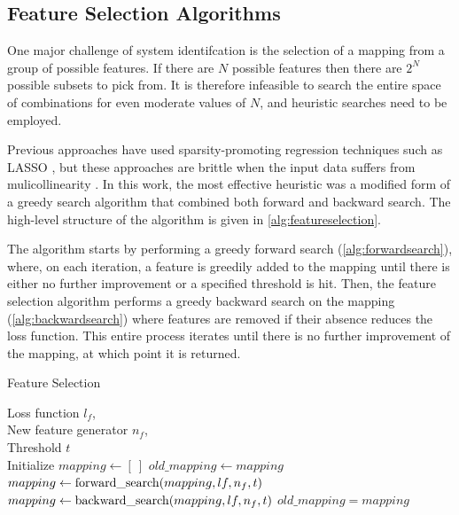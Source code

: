 \documentclass{article}
\begin{document}
\subsection{Feature Selection Algorithms}

One major challenge of system identifcation is the selection of a mapping from a group of possible features. If there are $N$ possible features then there are $2^N$ possible subsets to pick from. It is therefore infeasible to search the entire space of combinations for even moderate values of $N$, and heuristic searches need to be employed. 

Previous approaches have used sparsity-promoting regression techniques such as LASSO \cite{tibshirani1996regression}, but these approaches are brittle when the input data suffers from mulicollinearity \cite{rudy2017data}. In this work, the most effective heuristic was a modified form of a greedy search algorithm that combined both forward and backward search. The high-level structure of the algorithm is given in \cref{alg:featureselection}.

The algorithm starts by performing a greedy forward search (\cref{alg:forwardsearch}), where, on each iteration, a feature is greedily added to the mapping until there is either no further improvement or a specified threshold is hit. Then, the feature selection algorithm performs a greedy backward search on the mapping (\cref{alg:backwardsearch}) where features are removed if their absence reduces the loss function. This entire process iterates until there is no further improvement of the mapping, at which point it is returned.

\begin{algorithm}[tb]
   \caption{Feature Selection}
   \label{alg:featureselection}
\begin{algorithmic}
    Loss function $l_f$, \\
   \quad \quad \quad New feature generator $n_f$, \\
   \quad \quad \quad Threshold $t$ \\
   \STATE Initialize $mapping \gets [ \ ]$
   \REPEAT
   \STATE $old\_mapping \gets mapping$
   \STATE $mapping \gets {\rm forward\_search}(mapping, lf, n_f, t)$
   \STATE $mapping \gets {\rm backward\_search}(mapping, lf, n_f, t)$
   \UNTIL $old\_mapping = mapping$
\end{algorithmic}
\end{algorithm}
\end{document}

